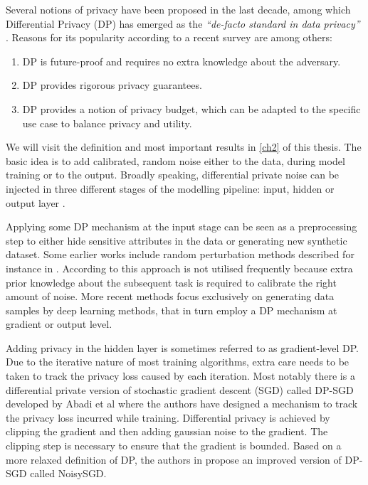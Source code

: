 Several notions of privacy have been proposed in the last decade, among which Differential Privacy (DP) has emerged as the \textit{``de-facto standard in data privacy''} \parencite{kim2021survey}. Reasons for its popularity according to a recent survey \parencite{surv_dp2021} are among others:

\begin{enumerate}
    \item DP is future-proof and requires no extra knowledge about the adversary.
    \item DP provides rigorous privacy guarantees.
    \item DP provides a notion of privacy budget, which can be adapted to the specific use case to balance privacy and utility.
\end{enumerate}

We will visit the definition and most important results in \cref{ch2} of this thesis. The basic idea is to add calibrated, random noise either to the data, during model training or to the output. Broadly speaking, differential private noise can be injected in three different stages of the modelling pipeline: input, hidden or output layer \parencite[cf.][]{zhao2019differential}. 

Applying some DP mechanism at the input stage can be seen as a preprocessing step to either hide sensitive attributes in the data or generating new synthetic dataset. Some earlier works include random perturbation methods described for instance in \parencite{input_levelDP,erm_dp_input}. According to \parencite{wang2023differential} this approach is not utilised frequently because extra prior knowledge about the subsequent task is required to calibrate the right amount of noise. More recent methods focus exclusively on generating data samples by deep learning methods, that in turn employ a DP mechanism at gradient or output level. 

Adding privacy in the hidden layer is sometimes referred to as gradient-level DP. Due to the iterative nature of most training algorithms, extra care needs to be taken to track the privacy loss caused by each iteration. Most notably there is a differential private version of stochastic gradient descent (SGD) called DP-SGD developed by Abadi et al \parencite{Abadi_2016} where the authors have designed a mechanism to track the privacy loss incurred while training. Differential privacy is achieved by clipping the gradient and then adding gaussian noise to the gradient. The clipping step is necessary to ensure that the gradient is bounded. Based on a more relaxed definition of DP, the authors in \parencite{bu2020deep} propose an improved version of DP-SGD called NoisySGD. 

